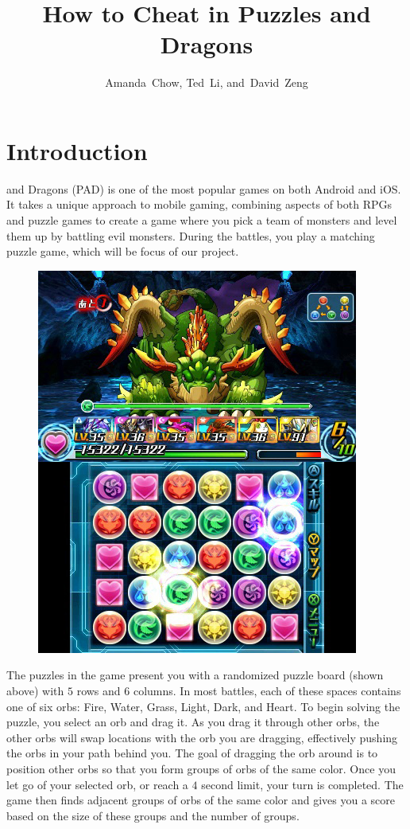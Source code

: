 \documentclass[journal,final,letterpaper,11pt]{IEEEtran}
\begin{document}
\title{How to Cheat in Puzzles and Dragons}
\author{Amanda~Chow, Ted~Li, and~David~Zeng}
\maketitle

\section{Introduction}
 and Dragons (PAD) is one of the most popular games on both  Android and iOS. It takes a unique approach to mobile gaming, combining aspects of both RPGs and puzzle games to create a game where you pick a team of monsters and level them up by battling evil monsters. During the battles, you play a matching puzzle game, which will be focus of our project.

\begin{figure}[h]
\centering
\includegraphics[scale=0.5]{pad.jpg}
\end{figure}

The puzzles in the game present you with a randomized puzzle board (shown above) with $5$ rows and $6$ columns. In most battles, each of these spaces contains one of six orbs: Fire, Water, Grass, Light, Dark, and Heart. To begin solving the puzzle, you select an orb and drag it. As you drag it through other orbs, the other orbs will swap locations with the orb you are dragging, effectively pushing the orbs in your path behind you. The goal of dragging the orb around is to position other orbs so that you form groups of orbs of the same color. Once you let go of your selected orb, or reach a $4$ second limit, your turn is completed. The game then finds adjacent groups of orbs of the same color and gives you a score based on the size of these groups and the number of groups.
\end{document}
